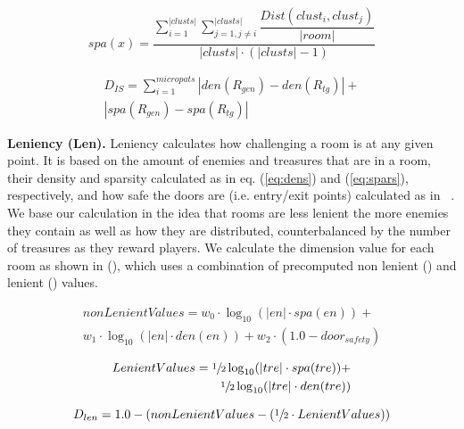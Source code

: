 \begin{equation} \label{eq:spars}
spa(x)= \dfrac{\sum_{i=1}^{\left | clusts \right |}\sum_{j=1, j\neq i}^{\left | clusts \right |}\dfrac{Dist(clust_{i}, clust_{j})}{\left | room \right |}}{\left | clusts \right | \cdot (\left | clusts \right | - 1)}
\end{equation}

\begin{equation} \label{eq:innersimDim}
\begin{split}
D_{IS} = \sum_{i=1}^{micropats}\left | den(R_{gen}) - den(R_{tg}) \right | + \\ \left | spa(R_{gen}) - spa(R_{tg}) \right |
\end{split}
\end{equation}

\textbf{Leniency (Len).} Leniency calculates how challenging a room is at any given point. It is based on the amount of enemies and treasures that are in a room, their density and sparsity calculated as in eq. (\ref{eq:dens}) and (\ref{eq:spars}), respectively, and how safe the doors are (i.e. entry/exit points) calculated as in ~\cite{p6Baldwin2017}. We base our calculation in the idea that rooms are less lenient the more enemies they contain as well as how they are distributed, counterbalanced by the number of treasures as they reward players. We calculate the dimension value for each room as shown in (), which uses a combination of precomputed non lenient () and lenient () values.


\begin{equation} \label{eq:nonlenvals}
\begin{split}
nonLenientValues = w_{0} \cdot \log_{10}(\left | en \right | \cdot spa(en)) + \\ w_{1} \cdot \log_{10}(\left | en \right | \cdot den(en)) + w_{2} \cdot (1.0 - door_{safety})
\end{split}
\end{equation}

\begin{equation} \label{eq:lenvals}
\begin{split}
LenientValues = \sfrac{1}{2} \log_{10}(\left | tre \right | \cdot spa(tre)) + \\ \sfrac{1}{2} \log_{10}(\left | tre \right | \cdot den(tre))
\end{split}
\end{equation}

\begin{equation} \label{eq:lendim}
D_{len} = 1.0 - (nonLenientValues - (\sfrac{1}{2} \cdot LenientValues))
\end{equation}

